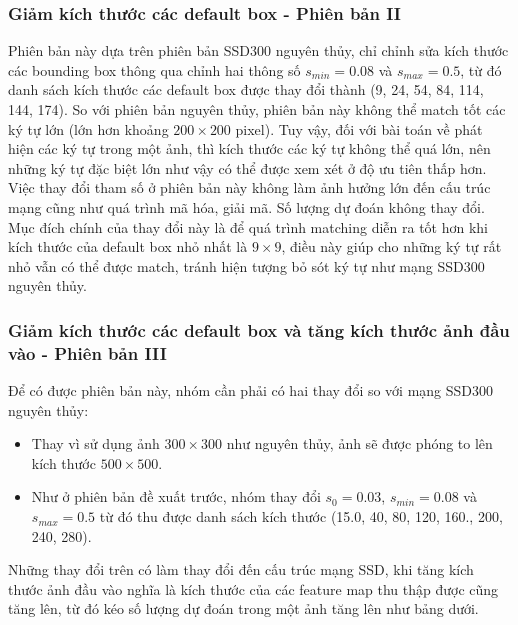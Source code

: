 \documentclass[a4paper]{article}
\theoremstyle{definition}
\begin{document}
	\subsubsection{Giảm kích thước các default box - Phiên bản II}
	
	Phiên bản này dựa trên phiên bản SSD300 nguyên thủy\cite{liu2016ssd}, chỉ chỉnh sửa kích thước các bounding box thông qua chỉnh hai thông số $s_{min} = 0.08$ và $s_{max} = 0.5$, từ đó danh sách kích thước các default box được thay đổi thành (9, 24, 54, 84, 114, 144, 174). So với phiên bản nguyên thủy, phiên bản này không thể match tốt các ký tự lớn (lớn hơn khoảng $200 \times 200$ pixel). Tuy vậy, đối với bài toán về phát hiện các ký tự trong một ảnh, thì kích thước các ký tự không thể quá lớn, nên những ký tự đặc biệt lớn như vậy có thể được xem xét ở độ ưu tiên thấp hơn.\\
	Việc thay đổi tham số ở phiên bản này không làm ảnh hưởng lớn đến cấu trúc mạng cũng như quá trình mã hóa, giải mã. Số lượng dự đoán không thay đổi.\\
	Mục đích chính của thay đổi này là để quá trình matching diễn ra tốt hơn khi kích thước của default box nhỏ nhất là $9 \times 9$, điều này giúp cho những ký tự rất nhỏ vẫn có thể được match, tránh hiện tượng bỏ sót ký tự như mạng SSD300 nguyên thủy\cite{liu2016ssd}.
	
	\subsubsection{Giảm kích thước các default box và tăng kích thước ảnh đầu vào - Phiên bản III}
	
	Để có được phiên bản này, nhóm cần phải có hai thay đổi so với mạng SSD300 nguyên thủy\cite{liu2016ssd}:
	\begin{itemize}
		\item Thay vì sử dụng ảnh $300 \times 300$ như nguyên thủy, ảnh sẽ được phóng to lên kích thước $500 \times 500$.
		\item Như ở phiên bản đề xuất trước, nhóm thay đổi $s_0 = 0.03$, $s_{min} = 0.08$ và $s_{max} = 0.5$ từ đó thu được danh sách kích thước (15.0, 40, 80, 120, 160., 200, 240, 280).
	\end{itemize}
	Những thay đổi trên có làm thay đổi đến cấu trúc mạng SSD\cite{liu2016ssd}, khi tăng kích thước ảnh đầu vào nghĩa là kích thước của các feature map thu thập được cũng tăng lên, từ đó kéo số lượng dự đoán trong một ảnh tăng lên như bảng dưới.\\
	
\end{document}
